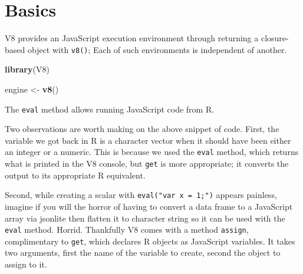 \documentclass[10pt,]{krantz}
\makeatletter
\newenvironment{Shaded}{\begin{snugshade}}{\end{snugshade}}
\newcommand{\CommentTok}[1]{\textcolor[rgb]{0.37,0.37,0.37}{\textit{#1}}}
\newcommand{\KeywordTok}[1]{\textcolor[rgb]{0.27,0.27,0.27}{\textbf{#1}}}
\newcommand{\NormalTok}[1]{#1}
\newcommand{\OperatorTok}[1]{\textcolor[rgb]{0.43,0.43,0.43}{\textbf{#1}}}
\newcommand{\StringTok}[1]{\textcolor[rgb]{0.5,0.5,0.5}{#1}}
\newenvironment{kframe}{%
\medskip{}
\setlength{\fboxsep}{.8em}
 \def\at@end@of@kframe{}%
 \ifinner\ifhmode%
  \def\at@end@of@kframe{\end{minipage}}%
  \begin{minipage}{\columnwidth}%
 \fi\fi%
 \def\FrameCommand##1{\hskip\@totalleftmargin \hskip-\fboxsep
 \colorbox{shadecolor}{##1}\hskip-\fboxsep
     \hskip-\linewidth \hskip-\@totalleftmargin \hskip\columnwidth}%
 \MakeFramed {\advance\hsize-\width
   \@totalleftmargin\z@ \linewidth\hsize
   \@setminipage}}%
 {\par\unskip\endMakeFramed%
 \at@end@of@kframe}
\renewenvironment{Shaded}{\begin{kframe}}{\end{kframe}}
\makeatother
\begin{document}
\hypertarget{v8-basics}{%
\section{Basics}\label{v8-basics}}

V8 provides an JavaScript execution environment through returning a closure-based object with \texttt{v8()}; Each of such environments is independent of another.

\begin{Shaded}
\begin{Highlighting}[]
\KeywordTok{library}\NormalTok{(V8)}

\NormalTok{engine <-}\StringTok{ }\KeywordTok{v8}\NormalTok{()}
\end{Highlighting}
\end{Shaded}

The \texttt{eval} method allows running JavaScript code from R.

\begin{Shaded}
\end{Shaded}

Two observations are worth making on the above snippet of code. First, the variable we got back in R is a character vector when it should have been either an integer or a numeric. This is because we used the \texttt{eval} method, which returns what is printed in the V8 console, but \texttt{get} is more appropriate; it converts the output to its appropriate R equivalent.

\begin{Shaded}
\end{Shaded}

Second, while creating a scalar with \texttt{eval("var\ x\ =\ 1;")} appears painless, imagine if you will the horror of having to convert a data frame to a JavaScript array via jsonlite then flatten it to character string so it can be used with the \texttt{eval} method. Horrid. Thankfully V8 comes with a method \texttt{assign}, complimentary to \texttt{get}, which declares R objects as JavaScript variables. It takes two arguments, first the name of the variable to create, second the object to assign to it.
\end{document}
